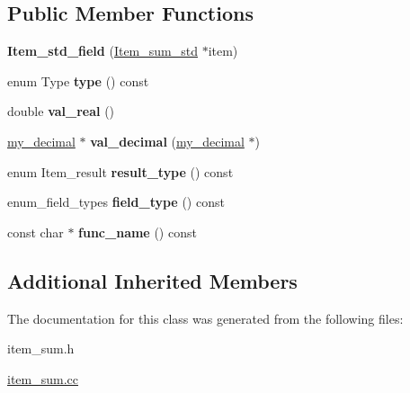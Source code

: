 \subsection*{Public Member Functions}
\begin{DoxyCompactItemize}
\item 
\mbox{\label{classItem__std__field_a31a9d154661329a4bb793887d9575330}} 
{\bfseries Item\+\_\+std\+\_\+field} (\mbox{\hyperlink{classItem__sum__std}{Item\+\_\+sum\+\_\+std}} $\ast$item)
\item 
\mbox{\label{classItem__std__field_a1d588693a3e81df62adbf6ee662fe897}} 
enum Type {\bfseries type} () const
\item 
\mbox{\label{classItem__std__field_a64cbfcad7dd74d389ea4eeb8b43e55b2}} 
double {\bfseries val\+\_\+real} ()
\item 
\mbox{\label{classItem__std__field_adbc6acf6020f3e4def147c54fd77e8d4}} 
\mbox{\hyperlink{classmy__decimal}{my\+\_\+decimal}} $\ast$ {\bfseries val\+\_\+decimal} (\mbox{\hyperlink{classmy__decimal}{my\+\_\+decimal}} $\ast$)
\item 
\mbox{\label{classItem__std__field_a267634fda5fe555b29bf95ea8c576b22}} 
enum Item\+\_\+result {\bfseries result\+\_\+type} () const
\item 
\mbox{\label{classItem__std__field_a9739c7bba2b9f4bfca5bfd81db5ed024}} 
enum\+\_\+field\+\_\+types {\bfseries field\+\_\+type} () const
\item 
\mbox{\label{classItem__std__field_a140aa734baf8c47e8e51c8e1c51ffe20}} 
const char $\ast$ {\bfseries func\+\_\+name} () const
\end{DoxyCompactItemize}
\subsection*{Additional Inherited Members}


The documentation for this class was generated from the following files\+:\begin{DoxyCompactItemize}
\item 
item\+\_\+sum.\+h\item 
\mbox{\hyperlink{item__sum_8cc}{item\+\_\+sum.\+cc}}\end{DoxyCompactItemize}
